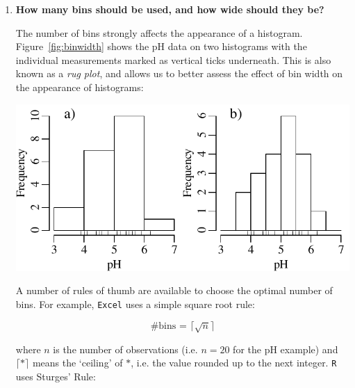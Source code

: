 \begin{enumerate}

\item\textbf{How many bins should be used, and how wide should they be?}

  The number of bins strongly affects the appearance of a histogram.
  Figure~\ref{fig:binwidth} shows the pH data on two histograms with
  the individual measurements marked as vertical ticks
  underneath. This is also known as a \emph{rug plot}, and allows us
  to better assess the effect of bin width on the appearance of
  histograms:
  
  \noindent\begin{minipage}[t][][b]{.55\linewidth}
  \includegraphics[width=\textwidth]{../figures/binwidth.pdf}\medskip
  \end{minipage}
  \begin{minipage}[t][][t]{.45\linewidth}
    \label{fig:binwidth}
  \end{minipage}

  A number of rules of thumb are available to choose the optimal number
  of bins. For example, \texttt{Excel} uses a simple square root rule:

  \begin{equation}
    \mbox{\#{bins} = } \lceil\sqrt{n}\rceil
  \end{equation}

  \noindent where $n$ is the number of observations (i.e. $n = 20$ for
  the pH example) and $\lceil\ast\rceil$ means the `ceiling' of
  $\ast$, i.e. the value rounded up to the next integer. \texttt{R}
  uses Sturges' Rule:


\end{enumerate}
